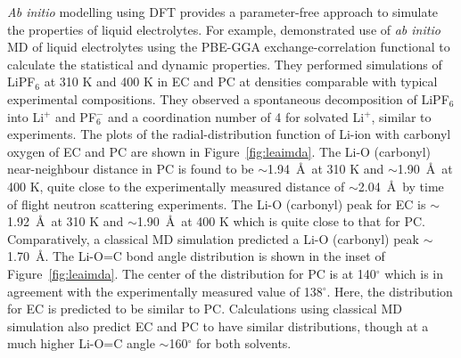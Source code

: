 \documentclass[../main.tex]{subfiles}
\begin{document}
\textit{Ab initio} modelling using DFT provides a parameter-free approach to simulate the properties of liquid electrolytes. For example, \citeauthor{Ganesh2011} demonstrated use of \textit{ab initio} MD of liquid electrolytes using the PBE-GGA exchange-correlation functional to calculate the statistical and dynamic properties.\cite{Ganesh2011} They performed simulations of LiPF$_6$ at 310 K and 400 K in EC and PC at densities comparable with typical experimental compositions. They observed a spontaneous decomposition of LiPF$_6$ into Li$^+$ and PF$_6^-$ and a coordination number of 4 for solvated Li$^+$, similar to experiments. The plots of the radial-distribution function of Li-ion with carbonyl oxygen of EC and PC are shown in Figure~\ref{fig:leaimda}. The Li-O (carbonyl) near-neighbour distance in PC is found to be $\sim$1.94~\AA \ at 310 K and $\sim$1.90~\AA \ at 400 K, quite close to the experimentally measured distance of $\sim$2.04~\AA \ by time of flight neutron scattering experiments.\cite{Kameda2007} The  Li-O (carbonyl) peak for EC is $\sim$1.92~\AA \ at 310 K and $\sim$1.90~\AA \ at 400 K which is quite close to that for PC. Comparatively, a classical MD simulation predicted a Li-O (carbonyl) peak $\sim$1.70~\AA.\cite{soetens_molecular_1998} The Li-O=C bond angle distribution is shown in the inset of Figure~\ref{fig:leaimda}. The center of the distribution for PC is at 140$^\circ$ which is in agreement with the experimentally measured value of 138$^\circ$.\cite{Kameda2007} Here, the distribution for EC is predicted to be similar to PC. Calculations using classical MD simulation also predict EC and PC to have similar distributions, though at a much higher Li-O=C angle $\sim$160$^\circ$ for both solvents.\cite{soetens_molecular_1998}
\end{document}
